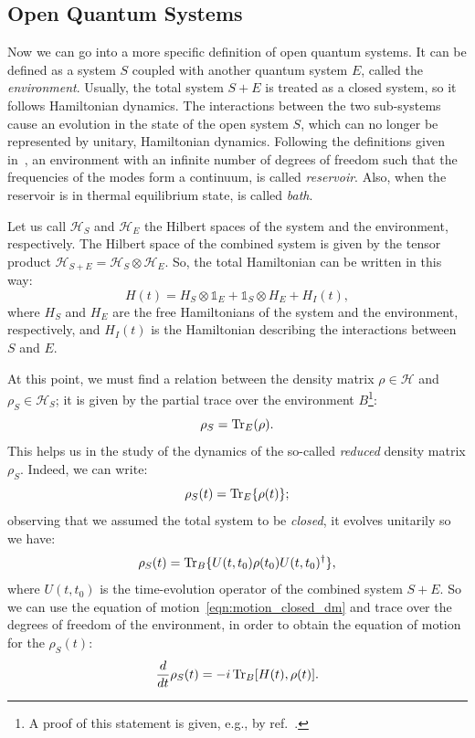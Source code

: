 \subsection{Open Quantum Systems}
Now we can go into a more specific definition of open quantum systems. It can be defined as a system $S$ coupled with another quantum system $E$, called the \emph{environment}. Usually, the total system $S+E$ is treated as a closed system, so it follows Hamiltonian dynamics. The interactions between the two sub-systems cause an evolution in the state of the open system $S$, which can no longer be represented by unitary, Hamiltonian dynamics. Following the definitions given in~\cite{pet_breuer:open_quantum}, an environment with an infinite number of degrees of freedom such that the frequencies of the modes form a continuum, is called \emph{reservoir}. Also, when the reservoir is in thermal equilibrium state, is called \emph{bath}.

Let us call $\mathcal{H}_S$ and $\mathcal{H}_E$ the Hilbert spaces of the system and the environment, respectively. The Hilbert space of the combined system is given by the tensor product $\mathcal{H}_{S+E} = \mathcal{H}_S \otimes \mathcal{H}_E$. So, the total Hamiltonian can be written in this way:
\begin{equation}
    H(t) = H_S \otimes \mathds{1}_E + \mathds{1}_S \otimes H_E + H_I(t),
\end{equation}
where $H_S$ and $H_E$ are the free Hamiltonians of the system and the environment, respectively, and $H_I(t)$ is the Hamiltonian describing the interactions between $S$ and $E$.

At this point, we must find a relation between the density matrix $\rho \in \mathcal{H}$ and $\rho_S \in \mathcal{H}_S$; it is given by the partial trace over the environment $B$\footnote{A proof of this statement is given, e.g., by ref.~\cite{nielsen_chuang}.}:
\begin{equation}
    \rho_S = \operatorname{Tr}_E(\rho).
\end{equation}
This helps us in the study of the dynamics of the so-called \emph{reduced} density matrix $\rho_S$. Indeed, we can write:
\begin{equation}
    \rho_S(t) = \operatorname{Tr}_E\{\rho(t)\};
\end{equation}
observing that we assumed the total system to be \emph{closed}, it evolves unitarily so we have:
\begin{equation}
    \rho_S(t) = \operatorname{Tr}_B\{U(t, t_0)\rho(t_0)U(t, t_0)^\dagger\},
\end{equation}
where $U(t, t_0)$ is the time-evolution operator of the combined system $S+E$. So we can use the equation of motion~\ref{eqn:motion_closed_dm} and trace over the degrees of freedom of the environment, in order to obtain the equation of motion for the $\rho_S(t)$:
\begin{equation}
\label{eqn:motion_open}
    \frac{d}{dt}\rho_S(t) = -i \operatorname{Tr}_B[H(t), \rho(t)].
\end{equation}


